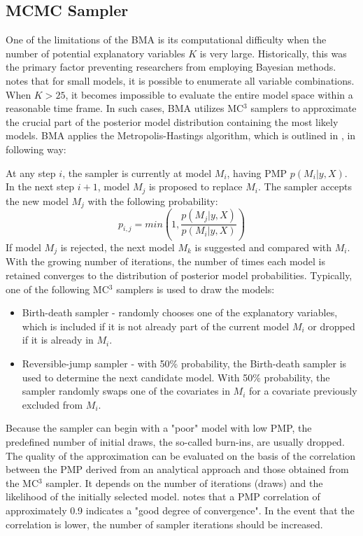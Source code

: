 \subsection{\ac{MCMC} Sampler}
\label{ch2sec:mc3}
One of the limitations of the \ac{BMA} is its computational difficulty when the number of potential explanatory variables $K$ is very large. Historically, this was the primary factor preventing researchers from employing Bayesian methods. \citet{Zeugner2011} notes that for small models, it is possible to enumerate all variable combinations. When $K > 25$, it becomes impossible to evaluate the entire model space within a reasonable time frame. In such cases, \ac{BMA} utilizes MC$^{3}$ samplers to approximate the crucial part of the posterior model distribution containing the most likely models. \ac{BMA} applies the Metropolis-Hastings algorithm, which is outlined in \citet{Zeugner2011}, in following way:

At any step $i$, the sampler is currently at model $M_{i}$, having \ac{PMP} $p(M_{i} \vert y,X)$. In the next step $i+1$, model $M_{j}$ is proposed to replace $M_{i}$. The sampler accepts the new model $M_{j}$ with the following probability:
\begin{equation}\label{ch2eq:sampler}
	p_{i,j} = min \left( 1, \frac{p(M_{j} \vert y,X)}{p(M_{i} \vert y,X)}\right)
\end{equation}
If model $M_{j}$ is rejected, the next model $M_{k}$ is suggested and compared with $M_{i}$. With the growing number of iterations, the number of times each model is retained converges to the distribution of posterior model probabilities. Typically, one of the following MC$^{3}$ samplers is used to draw the models:
%
\begin{itemize}
	\item{Birth-death sampler - randomly chooses one of the explanatory variables, which is included if it is not already part of the current model $M_{i}$ or dropped if it is already in $M_{i}$.}
	\item{Reversible-jump sampler - with 50\% probability, the Birth-death sampler is used to determine the next candidate model. With 50\% probability, the sampler randomly swaps one of the covariates in $M_{i}$ for a covariate previously excluded from $M_{i}$.}
\end{itemize}
%
Because the sampler can begin with a "poor" model with low \ac{PMP}, the predefined number of initial draws, the so-called burn-ins, are usually dropped. The quality of the approximation can be evaluated on the basis of the correlation between the \ac{PMP} derived from an analytical approach and those obtained from the MC$^{3}$ sampler. It depends on the number of iterations (draws) and the likelihood of the initially selected model. \citet{Zeugner2011} notes that a \ac{PMP} correlation of approximately 0.9 indicates a "good degree of convergence". In the event that the correlation is lower, the number of sampler iterations should be increased. 
%
%
%
%
%
